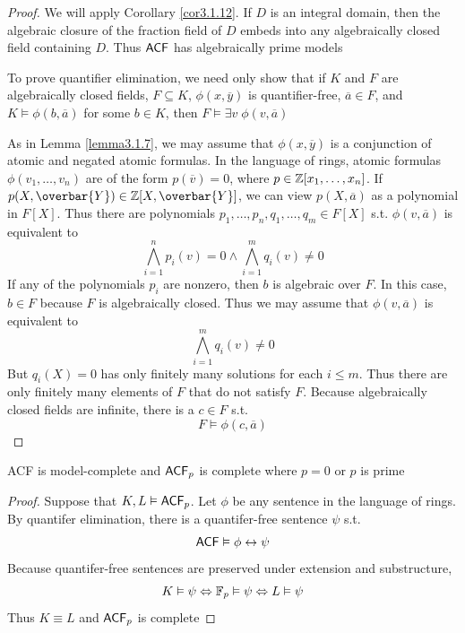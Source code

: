 \documentclass[11pt]{article}
\begin{document}
\begin{proof}
We will apply Corollary \ref{cor3.1.12}. If \(D\) is an integral domain, then
the algebraic closure of the fraction field of \(D\) embeds into any
algebraically closed field containing \(D\). Thus \(\textsf{ACF}\) has algebraically prime
models

To prove quantifier elimination, we need only show that if \(K\) and \(F\) are
algebraically closed fields, \(F\subseteq K\), \(\phi(x,\overbar{y})\) is
quantifier-free, \(\overbar{a}\in F\), and \(K\vDash\phi(b,\overbar{a})\)
for some \(b\in K\), then \(F\vDash\exists v\;\phi(v,\overbar{a})\)

As in Lemma \ref{lemma3.1.7}, we may assume that \(\phi(x,\overbar{y})\) is a
conjunction of atomic and negated atomic formulas. In the language of rings,
atomic formulas \(\phi(v_1,\dots,v_n)\) are of the form \(p(\overbar{v})=0\),
where \(p\in\mathbb{Z}[x_1,\dots,x_n]\). If \(p(X,\overbar{Y})\in\Z[X,\overbar{Y}]\),
we can view \(p(X,\overbar{a})\) as a polynomial in \(F[X]\). Thus there are
polynomials \(p_1,\dots,p_n,q_1,\dots,q_m\in F[X]\) s.t.
\(\phi(v,\overbar{a})\) is equivalent to
\begin{equation*}
\bigwedge_{i=1}^np_i(v)=0\wedge
\bigwedge_{i=1}^mq_i(v)\neq0
\end{equation*}
If any of the polynomials \(p_i\) are nonzero, then \(b\) is algebraic over
\(F\). In this case, \(b\in F\) because \(F\) is algebraically closed. Thus
we may assume that \(\phi(v,\overbar{a})\) is equivalent to
\begin{equation*}
\bigwedge_{i=1}^mq_i(v)\neq0
\end{equation*}
But  \(q_i(X)=0\) has only finitely many solutions for each \(i\le m\). Thus
there are only finitely many elements of \(F\) that do not satisfy \(F\).
Because algebraically closed fields are infinite, there is a \(c\in F\) s.t.
\begin{equation*}
F\vDash\phi(c,\overbar{a})
\end{equation*}
\end{proof}

\begin{corollary}[]
\label{cor3.2.3}
ACF is model-complete and \(\textsf{ACF}_p\) is complete where \(p=0\) or \(p\) is prime
\end{corollary}
\begin{proof}
Suppose that \(K,L\vDash\textsf{ACF}_p\). Let \(\phi\) be any sentence in the language
of rings. By quantifer elimination, there is a quantifer-free sentence \(\psi\)
s.t.
\begin{equation*}
\textsf{ACF}\vDash\phi\leftrightarrow\psi
\end{equation*}
Because quantifer-free sentences are preserved under extension and
substructure,
\begin{equation*}
K\vDash\psi\Leftrightarrow\mathbb{F}_p\vDash\psi\Leftrightarrow L\vDash\psi
\end{equation*}
Thus \(K\equiv L\) and \(\textsf{ACF}_p\) is complete
\end{proof}
\end{document}
